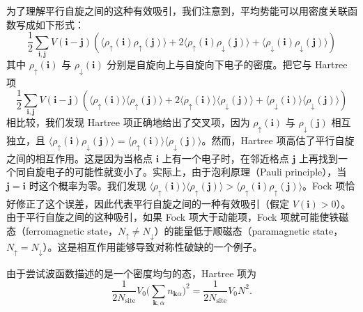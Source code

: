 为了理解平行自旋之间的这种有效吸引，我们注意到，平均势能可以用密度关联函数写成如下形式：
\begin{equation*}
\frac{1}{2}\sum_{\pmb{i},\pmb{j}} V(\pmb{i}-\pmb{j}) \left( \langle \rho_{\uparrow}(\pmb{i})\rho_{\uparrow}(\pmb{j}) \rangle + 2\langle \rho_{\uparrow}(\pmb{i})\rho_{\downarrow}(\pmb{j}) \rangle + \langle \rho_{\downarrow}(\pmb{i})\rho_{\downarrow}(\pmb{j}) \rangle \right)
\end{equation*}
其中 $\rho_{\uparrow}(\pmb{i})$ 与 $\rho_{\downarrow}(\pmb{i})$ 分别是自旋向上与自旋向下电子的密度。把它与 Hartree 项
\begin{equation*}
\frac{1}{2}\sum_{\pmb{i},\pmb{j}} V(\pmb{i}-\pmb{j}) \left( \langle \rho_{\uparrow}(\pmb{i}) \rangle \langle \rho_{\uparrow}(\pmb{j}) \rangle + 2\langle \rho_{\uparrow}(\pmb{i}) \rangle \langle \rho_{\downarrow}(\pmb{j}) \rangle + \langle \rho_{\downarrow}(\pmb{i}) \rangle \langle \rho_{\downarrow}(\pmb{j}) \rangle \right)
\end{equation*}
相比较，我们发现 Hartree 项正确地给出了交叉项，因为 $\rho_{\uparrow}(\pmb{i})$ 与 $\rho_{\downarrow}(\pmb{j})$ 相互独立，且 $\langle\rho_{\uparrow}(\pmb{i})\rho_{\downarrow}(\pmb{j})\rangle = \langle\rho_{\uparrow}(\pmb{i})\rangle \langle\rho_{\downarrow}(\pmb{j})\rangle$。然而，Hartree 项高估了平行自旋之间的相互作用。这是因为当格点 $\pmb{i}$ 上有一个电子时，在邻近格点 $\pmb{j}$ 上再找到一个同自旋电子的可能性就变小了。实际上，由于泡利原理（Pauli principle），当 $\pmb{j}=\pmb{i}$ 时这个概率为零。我们发现 $\langle\rho_{\uparrow}(\pmb{i})\rangle \langle\rho_{\uparrow}(\pmb{j})\rangle > \langle\rho_{\uparrow}(\pmb{i})\rho_{\uparrow}(\pmb{j})\rangle$。Fock 项恰好修正了这个误差，因此代表平行自旋之间的一种有效吸引（假定 $V(\pmb{i})>0$）。由于平行自旋之间的这种吸引，如果 Fock 项大于动能项，Fock 项就可能使铁磁态（ferromagnetic state，$N_{\uparrow}\neq N_{\downarrow}$）的能量低于顺磁态（paramagnetic state，$N_{\uparrow}=N_{\downarrow}$）。这是相互作用能够导致对称性破缺的一个例子。

由于尝试波函数描述的是一个密度均匀的态，Hartree 项为
\begin{equation*}
\frac{1}{2N_{\mathrm{site}}} V_0 \Big( \sum_{\pmb{k},\alpha} n_{\pmb{k}\alpha} \Big)^{2} = \frac{1}{2N_{\mathrm{site}}} V_0 N^{2}.
\end{equation*}

